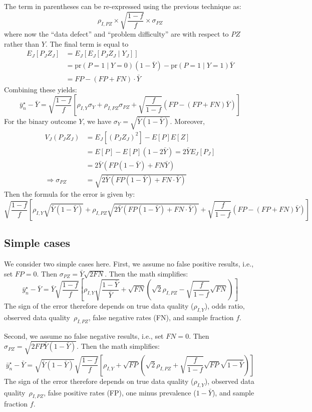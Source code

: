 \documentclass[11pt]{amsart}
\def\pr{\text{pr}}
\begin{document}
The term in parentheses can be re-expressed using the previous technique as:
$$
\rho_{I, PZ} \times \sqrt{\frac{1-f}{f}} \times \sigma_{PZ}
$$
where now the ``data defect'' and ``problem difficulty'' are with respect to $PZ$ rather than $Y$. The final term is equal to
$$
\begin{aligned}
E_J [P_J Z_J ] &= E_J [ E_J [ P_J Z_J \mid Y_J ] ] \\
&= \pr (P = 1 \mid Y = 0) (1-\bar Y) - \pr(P=1 \mid Y = 1) \bar Y \\
&= FP - (FP + FN) \cdot \bar Y
\end{aligned}
$$
Combining these yields:
$$
\bar y_n^\star - \bar Y = \sqrt{\frac{1-f}{f}} \left[\rho_{I,Y} \sigma_Y + \rho_{I, PZ} \sigma_{PZ} + \sqrt{\frac{f}{1-f}} \left( FP - (FP+FN) \bar Y \right) \right]
$$
For the binary outcome $Y$, we have $\sigma_Y = \sqrt{\bar Y (1-\bar Y)}$. Moreover,
$$
\begin{aligned}
V_J(P_J Z_J) &= E_J[(P_J Z_J)^2] - E[P] E[Z] \\
&= E[P] - E[P] (1 - 2 \bar Y) = 2 \bar Y E_J [ P_J ] \\
&= 2 \bar Y \left( FP (1-\bar Y) + FN \bar Y \right) \\
\Rightarrow \sigma_{PZ} &= \sqrt{ 2 \bar Y \left( FP (1-\bar Y) + FN \cdot  \bar Y \right) }
\end{aligned}
$$
Then the formula for the error is given by:
$$
\sqrt{\frac{1-f}{f}} \left[\rho_{I,Y} \sqrt{\bar Y (1-\bar Y)} + \rho_{I, PZ} \sqrt{ 2 \bar Y \left( FP (1-\bar Y) + FN \cdot \bar Y \right )} + \sqrt{\frac{f}{1-f}} \left( FP - (FP+FN) \bar Y \right) \right]
$$

\subsection{Simple cases}

We consider two simple cases here.  First, we assume no false positive results, i.e., set $FP=0$.  Then $\sigma_{PZ} = \bar Y \sqrt{2 FN}$.  Then the math simplifies:
$$
\bar y_n^\star - \bar Y = \bar Y \sqrt{\frac{1-f}{f}} \left[\rho_{I,Y} \sqrt{\frac{1-\bar Y}{\bar Y}} + \sqrt{FN} \left( \sqrt{2} \rho_{I, PZ} - \sqrt{\frac{f}{1-f}} \sqrt{FN} \right)  \right]
$$
The sign of the error therefore depends on true data quality ($\rho_{I, Y}$), odds ratio, observed data quality~$\rho_{I,PZ}$, false negative rates (FN), and sample fraction $f$.

Second, we assume no false negative results, i.e., set $FN=0$.  Then $\sigma_{PZ} = \sqrt{2 FP \bar Y (1-\bar Y)}$.  Then the math simplifies:
$$
\bar y_n^\star - \bar Y = \sqrt{\bar Y (1-\bar Y)} \sqrt{\frac{1-f}{f}} \left[\rho_{I,Y} +  \sqrt{FP} \left( \sqrt{2} \rho_{I, PZ} + \sqrt{\frac{f}{1-f}} \sqrt{FP} \sqrt{1-\bar Y} \right)  \right]
$$
The sign of the error therefore depends on true data quality ($\rho_{I, Y}$),  observed data quality~$\rho_{I,PZ}$, false positive rates (FP), one minus prevalence ($1-\bar Y$), and sample fraction $f$.
\end{document}
